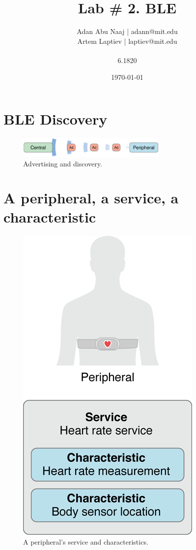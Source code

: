 \documentclass{lab}
\title{Lab \# 2. BLE} %
\author{Adan Abu Naaj | adann@mit.edu \\ Artem Laptiev | laptiev@mit.edu \\\\ 6.1820} %
\date{\today} %
\begin{document}
\maketitle

\newpage

\section{BLE Discovery}


\begin{figure}[h]
    \begin{center}
    \includegraphics[width=0.65\textwidth]{images/AdvertisingAndDiscovery.png} 
    \caption{Advertising and discovery.}
    \end{center}
\end{figure}

\section{A peripheral, a service, a characteristic}

\begin{figure}[h]
    \begin{center}
    \includegraphics[height=0.25\textheight]{images/CBPeripheralData.png} 
    \caption{A peripheral’s service and characteristics.}
    \end{center}
\end{figure}
\end{document}
